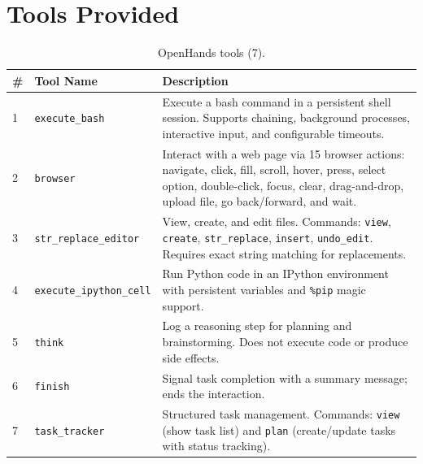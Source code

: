 \section{Tools Provided}
\label{sec:provided-tools}
\begin{table}[!h]
\begin{subtable}{\textwidth}
\centering
\caption{OpenHands tools (7).}
\label{tab:tools-openhands}
\small
\begin{tabular}{@{}llp{8.5cm}@{}}
\toprule
\textbf{\#} & \textbf{Tool Name} & \textbf{Description} \\
\midrule
1  & \texttt{execute\_bash}          & Execute a bash command in a persistent shell session. Supports chaining, background processes, interactive input, and configurable timeouts. \\
2  & \texttt{browser}                & Interact with a web page via 15 browser actions: navigate, click, fill, scroll, hover, press, select option, double-click, focus, clear, drag-and-drop, upload file, go back/forward, and wait. \\
3  & \texttt{str\_replace\_editor}   & View, create, and edit files. Commands: \texttt{view}, \texttt{create}, \texttt{str\_replace}, \texttt{insert}, \texttt{undo\_edit}. Requires exact string matching for replacements. \\
4  & \texttt{execute\_ipython\_cell} & Run Python code in an IPython environment with persistent variables and \texttt{\%pip} magic support. \\
5  & \texttt{think}                  & Log a reasoning step for planning and brainstorming. Does not execute code or produce side effects. \\
6  & \texttt{finish}                 & Signal task completion with a summary message; ends the interaction. \\
7  & \texttt{task\_tracker}          & Structured task management. Commands: \texttt{view} (show task list) and \texttt{plan} (create/update tasks with status tracking). \\
\bottomrule
\end{tabular}
\end{subtable}

\vspace{1em}


\end{table}
